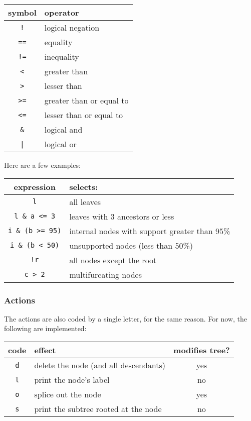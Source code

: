 \begin{center}
\begin{tabular}{cl}
symbol & operator \\
\hline
\texttt{!} & logical negation \\
\hline
\texttt{==} & equality \\
\texttt{!=} & inequality \\
\texttt{<} & greater than \\
\texttt{>} & lesser than \\
\texttt{>=} & greater than or equal to \\
\texttt{<=} & lesser than or equal to \\
\hline
\texttt{\&} & logical and \\
\hline
\texttt{|} & logical or
\end{tabular}
\end{center}

\noindent{}Here are a few examples:

\begin{center}
\begin{tabular}{cl}
expression & selects: \\
\hline
\texttt{l} & all leaves \\
\texttt{l \& a <= 3} & leaves with 3 ancestors or less \\
\texttt{i \& (b >= 95)} & internal nodes with support greater than 95\% \\ 
\texttt{i \& (b < 50)} & unsupported nodes (less than 50\%) \\
\texttt{!r} & all nodes except the root \\
\texttt{c > 2} & multifurcating nodes
\end{tabular}
\end{center}

\subsubsection{Actions}

The actions are also coded by a single letter, for the same reason. For now,
the following are implemented:

\begin{center}
\begin{tabular}{clc}
code & effect & modifies tree?\\
\hline
\texttt{d} & delete the node (and all descendants) & yes \\
\texttt{l} & print the node's label & no \\
\texttt{o} & splice out the node & yes \\
\texttt{s} & print the subtree rooted at the node & no \\
\end{tabular}
\end{center}

